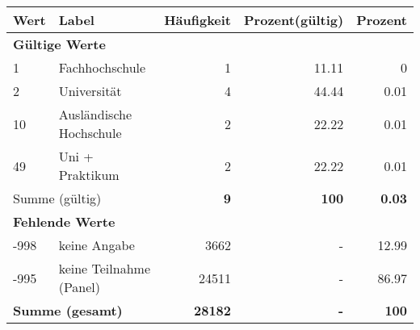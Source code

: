      \begin{longtable}{lXrrr}
     \toprule
     \textbf{Wert} & \textbf{Label} & \textbf{Häufigkeit} & \textbf{Prozent(gültig)} & \textbf{Prozent} \\
     \endhead
     \midrule
     \multicolumn{5}{l}{\textbf{Gültige Werte}}\\

     1 &
     \multicolumn{1}{X}{ Fachhochschule   } &


       \num{1} &
       \num[round-mode=places,round-precision=2]{11.11} &
         \num[round-mode=places,round-precision=2]{0} \\

     2 &
     \multicolumn{1}{X}{ Universität   } &


       \num{4} &
       \num[round-mode=places,round-precision=2]{44.44} &
         \num[round-mode=places,round-precision=2]{0.01} \\

     10 &
     \multicolumn{1}{X}{ Ausländische Hochschule   } &


       \num{2} &
       \num[round-mode=places,round-precision=2]{22.22} &
         \num[round-mode=places,round-precision=2]{0.01} \\

     49 &
     \multicolumn{1}{X}{ Uni + Praktikum   } &


       \num{2} &
       \num[round-mode=places,round-precision=2]{22.22} &
         \num[round-mode=places,round-precision=2]{0.01} \\
     \midrule
     \multicolumn{2}{l}{Summe (gültig)} &
       \textbf{\num{9}} &
     \textbf{100} &
       \textbf{\num[round-mode=places,round-precision=2]{0.03}} \\
     \multicolumn{5}{l}{\textbf{Fehlende Werte}}\\
       -998 &
       keine Angabe &
         \num{3662} &
        - &
         \num[round-mode=places,round-precision=2]{12.99} \\
       -995 &
       keine Teilnahme (Panel) &
         \num{24511} &
        - &
         \num[round-mode=places,round-precision=2]{86.97} \\
     \midrule
     \multicolumn{2}{l}{\textbf{Summe (gesamt)}} &
          \textbf{\num{28182}} &
        \textbf{-} &
        \textbf{100} \\
     \bottomrule
     \end{longtable}
     
